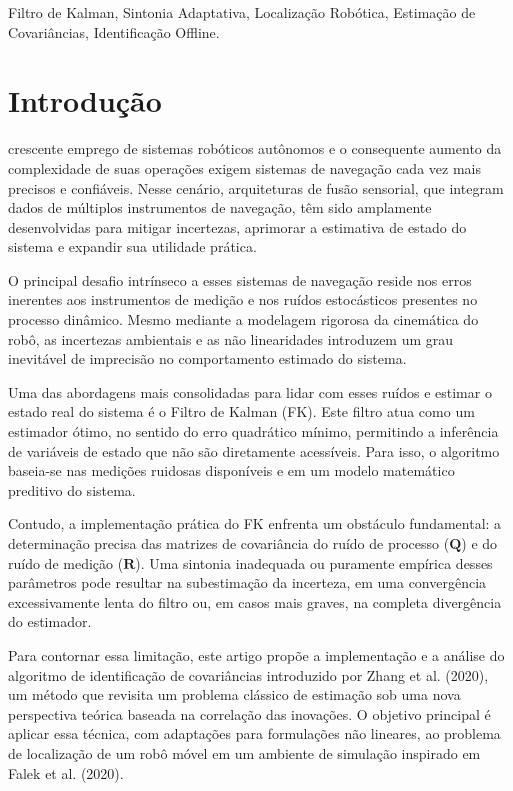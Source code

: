 \documentclass[journal]{IEEEtran}
\begin{document}
\begin{IEEEkeywords}
Filtro de Kalman, Sintonia Adaptativa, Localização Robótica, Estimação de Covariâncias, Identificação Offline.
\end{IEEEkeywords}

\IEEEpeerreviewmaketitle

\section{Introdução}
 crescente emprego de sistemas robóticos autônomos e o consequente aumento da complexidade de suas operações exigem sistemas de navegação cada vez mais precisos e confiáveis. Nesse cenário, arquiteturas de fusão sensorial, que integram dados de múltiplos instrumentos de navegação, têm sido amplamente desenvolvidas para mitigar incertezas, aprimorar a estimativa de estado do sistema e expandir sua utilidade prática.

O principal desafio intrínseco a esses sistemas de navegação reside nos erros inerentes aos instrumentos de medição e nos ruídos estocásticos presentes no processo dinâmico. Mesmo mediante a modelagem rigorosa da cinemática do robô, as incertezas ambientais e as não linearidades introduzem um grau inevitável de imprecisão no comportamento estimado do sistema.

Uma das abordagens mais consolidadas para lidar com esses ruídos e estimar o estado real do sistema é o Filtro de Kalman (FK). Este filtro atua como um estimador ótimo, no sentido do erro quadrático mínimo, permitindo a inferência de variáveis de estado que não são diretamente acessíveis. Para isso, o algoritmo baseia-se nas medições ruidosas disponíveis e em um modelo matemático preditivo do sistema.

Contudo, a implementação prática do FK enfrenta um obstáculo fundamental: a determinação precisa das matrizes de covariância do ruído de processo ($\mathbf{Q}$) e do ruído de medição ($\mathbf{R}$). Uma sintonia inadequada ou puramente empírica desses parâmetros pode resultar na subestimação da incerteza, em uma convergência excessivamente lenta do filtro ou, em casos mais graves, na completa divergência do estimador.

Para contornar essa limitação, este artigo propõe a implementação e a análise do algoritmo de identificação de covariâncias introduzido por Zhang et al. (2020), um método que revisita um problema clássico de estimação sob uma nova perspectiva teórica baseada na correlação das inovações. O objetivo principal é aplicar essa técnica, com adaptações para formulações não lineares, ao problema de localização de um robô móvel em um ambiente de simulação inspirado em Falek et al. (2020). 
\end{document}
